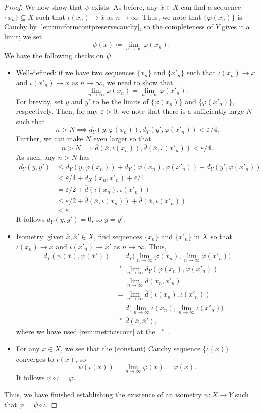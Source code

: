 \documentclass[../notes.tex]{subfiles}
\begin{document}
\begin{proof}
	We now show that $\psi$ exists. As before, any $\overline x\in X$ can find a sequence $\{x_n\}\subseteq X$ such that $\iota(x_n)\to\overline x$ as $n\to\infty$. Thus, we note that $\{\varphi(x_n)\}$ is Cauchy by \autoref{lem:uniformcontpreservecauchy}, so the completeness of $Y$ gives it a limit; we set
	\[\psi(\overline x)\coloneqq\lim_{n\to\infty}\varphi(x_n).\]
	We have the following checks on $\psi$.
	\begin{itemize}
		\item Well-defined: if we have two sequences $\{x_n\}$ and $\{x'_n\}$ such that $\iota(x_n)\to x$ and $\iota(x'_n)\to x$ as $n\to\infty$, we need to show that
		\[\lim_{n\to\infty}\varphi(x_n)=\lim_{n\to\infty}\varphi(x'_n).\]
		For brevity, set $y$ and $y'$ to be the limits of $\{\varphi(x_n)\}$ and $\{\varphi(x'_n)\}$, respectively. Then, for any $\varepsilon>0$, we note that there is a sufficiently large $N$ such that
		\[n>N\implies d_Y(y,\varphi(x_n)),d_Y(y',\varphi(x'_n))<\varepsilon/4.\]
		Further, we can make $N$ even larger so that
		\[n>N\implies\overline d(\overline x,\iota(x_n)),\overline d(\overline x,\iota(x'_n))<\varepsilon/4.\]
		As such, any $n>N$ has
		\begin{align*}
			d_Y(y,y') &\le d_Y(y,\varphi(x_n))+d_Y(\varphi(x_n),\varphi(x'_n))+d_Y(y',\varphi(x'_n)) \\
			&< \varepsilon/4+d_X(x_n,x'_n)+\varepsilon/4 \\
			&= \varepsilon/2+\overline d(\iota(x_n),\iota(x'_n)) \\
			&\le \varepsilon/2+\overline d(\overline x,\iota(x_n))+\overline d(\overline x,\iota(x'_n)) \\
			&< \varepsilon.
		\end{align*}
		It follows $d_Y(y,y')=0$, so $y=y'$.
		\item Isometry: given $\overline x,\overline x'\in X$, find sequences $\{x_n\}$ and $\{x'_n\}$ in $X$ so that $\iota(x_n)\to\overline x$ and $\iota(x'_n)\to\overline x'$ as $n\to\infty$. Thus,
		\begin{align*}
			d_Y(\psi(\overline x),\psi(\overline x')) &= d_Y\Big(\lim_{n\to\infty}\varphi(x_n),\lim_{n\to\infty}\varphi(x'_n)\Big) \\
			&\stackrel*= \lim_{n\to\infty}d_Y(\varphi(x_n),\varphi(x'_n)) \\
			&= \lim_{n\to\infty}d(x_n,x'_n) \\
			&= \lim_{n\to\infty}\overline d(\iota(x_n),\iota(x'_n)) \\
			&= \overline d\Big(\lim_{n\to\infty}\iota(x_n),\lim_{n\to\infty}\iota(x'_n)\Big) \\
			&\stackrel*= \overline d(\overline x,\overline x'),
		\end{align*}
		where we have used \autoref{rem:metriciscont} at the $\stackrel*=$.
		\item For any $x\in X$, we see that the (constant) Cauchy sequence $\{\iota(x)\}$ converges to $\iota(x)$, so
		\[\psi(\iota(x))=\lim_{n\to\infty}\varphi(x)=\varphi(x).\]
		It follows $\psi\circ\iota=\varphi$.
	\end{itemize}
	Thus, we have finished establishing the existence of an isometry $\psi\colon\overline X\to Y$ such that $\varphi=\psi\circ\iota$.
\end{proof}
\end{document}
